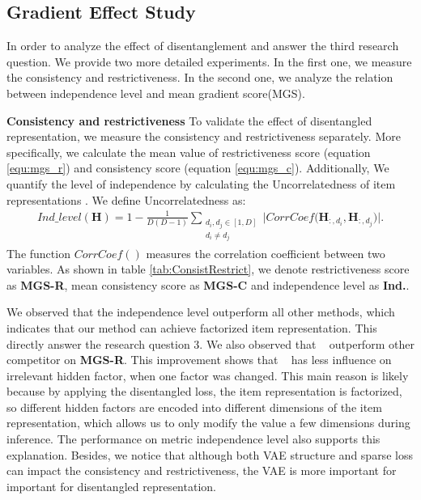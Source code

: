 \subsection{Gradient Effect Study}
In order to analyze the effect of disentanglement and answer the third research question. We provide two more detailed experiments. In the first one, we measure the consistency and restrictiveness. In the second one, we analyze the relation between independence level and mean gradient score(MGS).


\textbf{Consistency and restrictiveness}
To validate the effect of disentangled representation, we measure the consistency and restrictiveness separately. More specifically, we calculate the mean value of restrictiveness score (equation \ref{equ:mgs_r}) and consistency score (equation \ref{equ:mgs_c}). Additionally, We quantify the level of independence by calculating the Uncorrelatedness of item representations \cite{mazhou0Y019MacridVAE}. We define Uncorrelatedness as: 
\begin{equation}
\begin{split}
Ind\_level(\mathbf{H}) = 1 - \frac{1}{D(D-1)}\sum_{\substack{d_i, d_j \in [1,D] \\ d_i \neq d_j}  } \big|CorrCoef ( {\mathbf{H}_{:,d_i}, \mathbf{H}_{:,d_j}}\big ) |. 
\end{split}
\end{equation}
The function $CorrCoef()$ measures the correlation coefficient between two variables. As shown in table \ref{tab:ConsistRestrict}, we denote restrictiveness score as \textbf{MGS-R}, mean consistency score as \textbf{MGS-C} and independence level as \textbf{Ind.}. 

We observed that the independence level outperform all other methods, which indicates that our method can achieve factorized item representation. This  directly answer the research question 3. We also observed that \CGIR~ outperform other competitor on \textbf{MGS-R}. This improvement shows that \CGIR~ has less influence on irrelevant hidden factor, when one factor was changed. This main reason is likely because by applying the disentangled loss, the item representation is factorized, so different hidden factors are encoded into different dimensions of the item representation, which allows us to only modify the value a few dimensions during inference. The performance on metric independence level also supports this explanation. Besides, we notice that although both VAE structure and sparse loss can impact the consistency and restrictiveness, the VAE is more important for important for disentangled representation.


